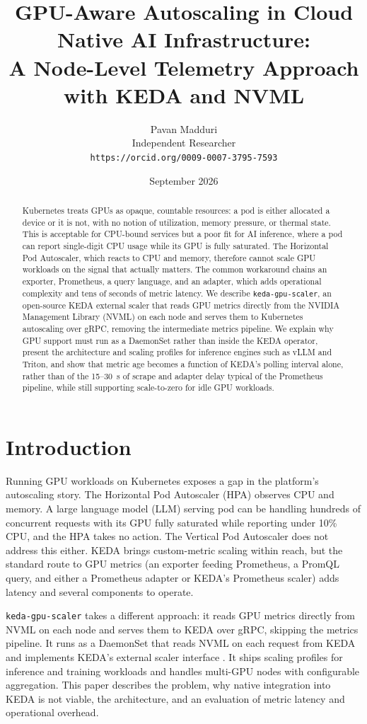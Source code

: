 \documentclass[11pt]{article}
\title{GPU-Aware Autoscaling in Cloud Native AI Infrastructure:\\
A Node-Level Telemetry Approach with KEDA and NVML}
\author{Pavan Madduri\\
Independent Researcher\\
\texttt{https://orcid.org/0009-0007-3795-7593}}
\date{September 2026}
\begin{document}
\maketitle

\begin{abstract}
Kubernetes treats GPUs as opaque, countable resources: a pod is either allocated
a device or it is not, with no notion of utilization, memory pressure, or thermal
state. This is acceptable for CPU-bound services but a poor fit for AI inference,
where a pod can report single-digit CPU usage while its GPU is fully saturated.
The Horizontal Pod Autoscaler, which reacts to CPU and memory, therefore cannot
scale GPU workloads on the signal that actually matters. The common workaround
chains an exporter, Prometheus, a query language, and an adapter, which adds
operational complexity and tens of seconds of metric latency. We describe
\texttt{keda-gpu-scaler}, an open-source KEDA external scaler that reads GPU
metrics directly from the NVIDIA Management Library (NVML) on each node and
serves them to Kubernetes autoscaling over gRPC, removing the intermediate
metrics pipeline. We explain why GPU support must run as a DaemonSet rather than
inside the KEDA operator, present the architecture and scaling profiles for
inference engines such as vLLM and Triton, and show that metric age becomes a
function of KEDA's polling interval alone, rather than of the 15--30~s of scrape
and adapter delay typical of the Prometheus pipeline, while still supporting
scale-to-zero for idle GPU workloads.
\end{abstract}

\section{Introduction}

Running GPU workloads on Kubernetes exposes a gap in the platform's autoscaling
story. The Horizontal Pod Autoscaler (HPA) observes CPU and memory. A large
language model (LLM) serving pod can be handling hundreds of concurrent requests
with its GPU fully saturated while reporting under 10\% CPU, and the HPA takes no
action. The Vertical Pod Autoscaler does not address this either. KEDA
\cite{keda} brings custom-metric scaling within reach, but the standard route to
GPU metrics (an exporter feeding Prometheus, a PromQL query, and either a
Prometheus adapter or KEDA's Prometheus scaler) adds latency and several
components to operate.

\texttt{keda-gpu-scaler} \cite{kgs} takes a different approach: it reads GPU
metrics directly from NVML \cite{nvml} on each node and serves them to KEDA over
gRPC, skipping the metrics pipeline. It runs as a DaemonSet that reads NVML on
each request from KEDA and implements KEDA's external scaler interface
\cite{keda-extscaler}. It ships scaling profiles for inference and training
workloads and handles multi-GPU nodes with configurable aggregation. This paper
describes the problem, why native integration into KEDA is not viable, the
architecture, and an evaluation of metric latency and operational overhead.
\end{document}
